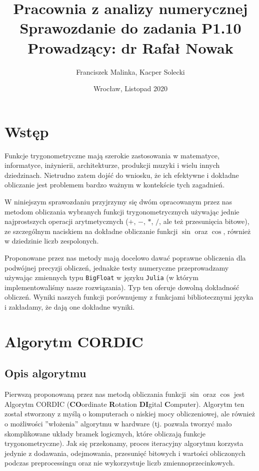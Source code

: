 \documentclass{mwart}
\title{Pracownia z analizy numerycznej \\
        \large Sprawozdanie do zadania \textbf{P1.10} \\
        Prowadzący: dr Rafał Nowak}
\author{Franciszek Malinka, Kacper Solecki}
\date{Wrocław, Listopad 2020}
\theoremstyle{remark}
\theoremstyle{definition}
\theoremstyle{definition}
\begin{document}
\maketitle

\section{Wstęp}
Funkcje trygonometryczne mają szerokie zastosowania w matematyce, informatyce, inżynierii, architekturze, produkcji muzyki i wielu innych dziedzinach. Nietrudno zatem dojść do wniosku, że ich efektywne i dokładne obliczanie jest problemem bardzo ważnym w kontekście tych zagadnień.

W niniejszym sprawozdaniu przyjrzymy się dwóm opracowanym przez nas metodom obliczania wybranych funkcji trygonometrycznych używając jednie najprostszych operacji arytmetycznych ($+$, $-$, $*$, $/$, ale też przesunięcia bitowe), ze szczególnym naciskiem na dokładne obliczanie funkcji $\sin$ oraz $\cos$, również w dziedzinie liczb zespolonych.

Proponowane przez nas metody mają docelowo dawać poprawne obliczenia dla podwójnej precyzji obliczeń, jednakże testy numeryczne przeprowadzamy używając zmiennych typu \texttt{BigFloat} w języku \texttt{Julia} (w którym implementowaliśmy nasze rozwiązania). Typ ten oferuje dowolną dokładność obliczeń. Wyniki naszych funkcji porównujemy z funkcjami bibliotecznymi języka i zakładamy, że dają one dokładne wyniki.

\section{Algorytm CORDIC}
\subsection{Opis algorytmu}

Pierwszą proponowaną przez nas metodą obliczania funkcji $\sin$ oraz $\cos$ jest Algorytm CORDIC (\textbf{CO}ordinate \textbf{R}otation \textbf{DI}gital \textbf{C}omputer). Algorytm ten został stworzony z myślą o komputerach o niskiej mocy obliczeniowej, ale również o możliwości ''włożenia'' algorytmu w hardware (tj. pozwala tworzyć mało skomplikowane układy bramek logicznych, które obliczają funkcje trygonometryczne). Jak się przekonamy, proces iteracyjny algorytmu korzysta jedynie z dodawania, odejmowania, przesunięć bitowych i wartości obliczonych podczas preprocessingu oraz nie wykorzystuje liczb zmiennoprzecinkowych.
\end{document}
